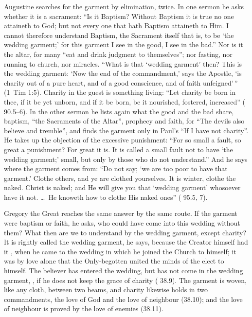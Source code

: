 Augustine searches for the garment by elimination, twice. In one sermon he
asks whether it is a sacrament: ``Is it Baptism? Without Baptism it is true no
one attaineth to God; but not every one that hath Baptism attaineth to Him. I
cannot therefore understand Baptism, the Sacrament itself that is, to be `the
wedding garment;' for this garment I see in the good, I see in the bad.'' Nor is
it the altar, for many ``eat and drink judgment to themselves''; nor fasting,
nor running to church, nor miracles. ``What is that `wedding garment' then?
This is the wedding garment: `Now the end of the commandment,' says the
Apostle, `is charity out of a pure heart, and of a good conscience, and of faith
unfeigned'\,'' (1~Tim 1:5). Charity in the guest is something living: ``Let
charity be born in thee, if it be yet unborn, and if it be born, be it
nourished, fostered, increased'' ( 90.5--6). In the other sermon he
lists again what the good and the bad share, baptism, ``the Sacraments of the
Altar'', prophecy and faith, for ``The devils also believe and tremble'', and
finds the garment only in Paul's ``If I have not charity''. He takes up the
objection of the excessive punishment: ``For so small a fault, so great a
punishment? For great it is. It is called a small fault not to have `the
wedding garment;' small, but only by those who do not understand.'' And he says
where the garment comes from: ``Do not say; `we are too poor to have that
garment.' Clothe others, and ye are clothed yourselves. It is winter, clothe
the naked. Christ is naked; and He will give you that `wedding garment'
whosoever have it not. \ldots\ He knoweth how to clothe His naked ones''
( 95.5, 7).

Gregory the Great reaches the same answer by the same route. If the garment
were baptism or faith, he asks, who could have come into this wedding without
them?  What then are we to understand by the wedding garment, except
charity? It is rightly called the wedding garment, he says, because the
Creator himself had it ,
when he came to the wedding in which he joined the Church to himself; it was by
love alone that the Only-begotten united the minds of the elect to himself. The
believer has entered the wedding, but has not come in the wedding garment,
, if he does not keep the grace of
charity ( 38.9). The garment is woven, like any
cloth, between two beams, and charity likewise holds in two commandments, the
love of God and the love of neighbour (38.10); and the love of neighbour is
proved by the love of enemies (38.11).

